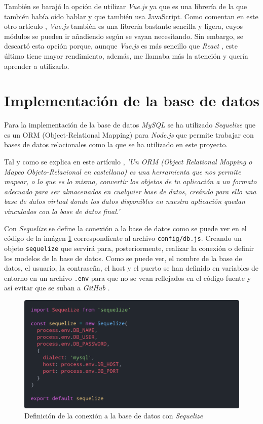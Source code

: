 También se barajó la opción de utilizar \textit{Vue.js} \cite{vuejs} ya que es una
librería de la que también había oído hablar y que también usa JavaScript.
Como comentan en este otro artículo \cite{vuejs-vs-react}, \textit{Vue.js} \cite{vuejs}
también es una librería bastante sencilla y ligera, cuyos módulos se pueden ir añadiendo
según se vayan necesitando. Sin embargo, se descartó esta opción porque, aunque
\textit{Vue.js} \cite{vuejs} es más sencillo que \textit{React} \cite{react}, este
último tiene mayor rendimiento, además, me llamaba más la atención y quería aprender a
utilizarlo.


\section{Implementación de la base de datos}
Para la implementación de la base de datos \textit{MySQL} \cite{mysql} se ha utilizado
\textit{Sequelize} \cite{sequelize} que es un ORM (Object-Relational Mapping) para
\textit{Node.js} \cite{nodejs} que permite trabajar con bases de datos relacionales
como la que se ha utilizado en este proyecto.

Tal y como se explica en este artículo \cite{orm}, \textit{'Un ORM (Object Relational
Mapping o Mapeo Objeto-Relacional en castellano) es una herramienta que nos permite mapear, o lo
que es lo mismo, convertir los objetos de tu aplicación a un formato adecuado para ser
almacenados en cualquier base de datos, creándo para ello una base de datos virtual
donde los datos disponibles en nuestra aplicación quedan vinculados con la base de datos
final.'}

Con \textit{Sequelize} \cite{sequelize} se define la conexión a la base de datos como se
puede ver en el código de la imágen \ref{fig:sequelize-db} correspondiente al archivo
\texttt{config/db.js}. Creando un objeto \texttt{sequelize} que servirá para,
posteriormente, realizar la conexión o definir los modelos de la base de datos. Como se
puede ver, el nombre de la base de datos, el usuario, la contraseña, el host y el puerto
se han definido en variables de entorno en un archivo \texttt{.env} para que no se vean
reflejados en el código fuente y así evitar que se suban a \textit{GitHub} \cite{github}.

\begin{figure}[H]
  \centering
  \includegraphics[width=1\textwidth]{img/sequelize-db}
  \caption{Definición de la conexión a la base de datos con \textit{Sequelize}}
  \label{fig:sequelize-db}
\end{figure}

